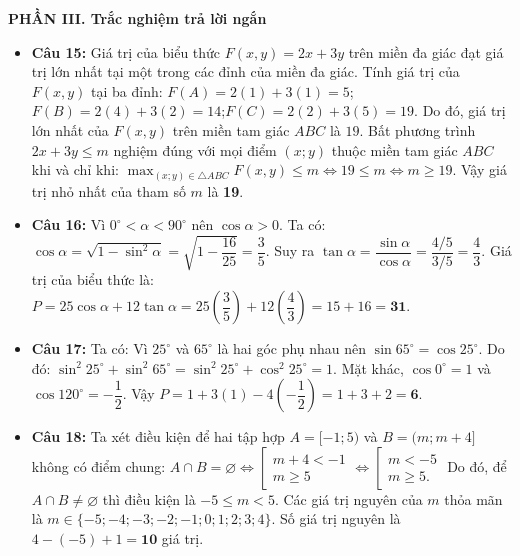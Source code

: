 \documentclass[12pt,a4paper]{article}
\begin{document}
\vspace{0.15cm}
\textbf{PHẦN III. Trắc nghiệm trả lời ngắn}
\begin{itemize}[leftmargin=0.6cm, itemsep=3pt]
    \item \textbf{Câu 15:} Giá trị của biểu thức $F(x, y) = 2x + 3y$ trên miền đa giác đạt giá trị lớn nhất tại một trong các đỉnh của miền đa giác. Tính giá trị của $F(x, y)$ tại ba đỉnh:
    $F(A) = 2(1) + 3(1) = 5$;\quad $F(B) = 2(4) + 3(2) = 14$;\quad $F(C) = 2(2) + 3(5) = 19$.
    Do đó, giá trị lớn nhất của $F(x, y)$ trên miền tam giác $ABC$ là $19$.
    Bất phương trình $2x + 3y \le m$ nghiệm đúng với mọi điểm $(x; y)$ thuộc miền tam giác $ABC$ khi và chỉ khi:
    $\max_{(x; y) \in \triangle ABC} F(x, y) \le m \iff 19 \le m \iff m \ge 19$.
    Vậy giá trị nhỏ nhất của tham số $m$ là \textbf{19}.
    \item \textbf{Câu 16:} Vì $0^\circ < \alpha < 90^\circ$ nên $\cos \alpha > 0$. Ta có:
    $\cos \alpha = \sqrt{1 - \sin^2 \alpha} = \sqrt{1 - \dfrac{16}{25}} = \dfrac{3}{5}$.
    Suy ra $\tan \alpha = \dfrac{\sin \alpha}{\cos \alpha} = \dfrac{4/5}{3/5} = \dfrac{4}{3}$.
    Giá trị của biểu thức là:
    $P = 25\cos \alpha + 12\tan \alpha = 25\left(\dfrac{3}{5}\right) + 12\left(\dfrac{4}{3}\right) = 15 + 16 = \textbf{31}$.
    \item \textbf{Câu 17:} Ta có:
    Vì $25^\circ$ và $65^\circ$ là hai góc phụ nhau nên $\sin 65^\circ = \cos 25^\circ$. Do đó:
    $\sin^2 25^\circ + \sin^2 65^\circ = \sin^2 25^\circ + \cos^2 25^\circ = 1$.
    Mặt khác, $\cos 0^\circ = 1$ và $\cos 120^\circ = -\dfrac{1}{2}$.
    Vậy $P = 1 + 3(1) - 4\left(-\dfrac{1}{2}\right) = 1 + 3 + 2 = \textbf{6}$.
    \item \textbf{Câu 18:} Ta xét điều kiện để hai tập hợp $A = [-1; 5)$ và $B = (m; m + 4]$ không có điểm chung:
    $A \cap B = \varnothing \iff \left[\begin{array}{l} m + 4 < -1 \\ m \ge 5 \end{array}\right. \iff \left[\begin{array}{l} m < -5 \\ m \ge 5. \end{array}\right.$
    Do đó, để $A \cap B \ne \varnothing$ thì điều kiện là $-5 \le m < 5$.
    Các giá trị nguyên của $m$ thỏa mãn là $m \in \{-5; -4; -3; -2; -1; 0; 1; 2; 3; 4\}$.
    Số giá trị nguyên là $4 - (-5) + 1 = \textbf{10}$ giá trị.
\end{itemize}
\end{document}
